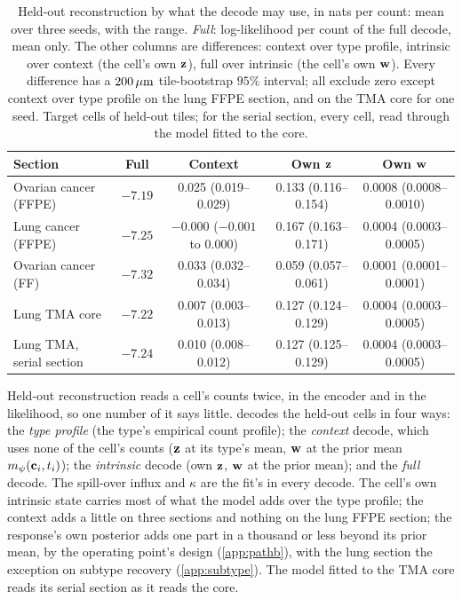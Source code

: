\begin{table}[!htbp]
\centering
\caption{Held-out reconstruction by what the decode may use, in nats per count: mean over three seeds, with the range. \emph{Full}: log-likelihood per count of the full decode, mean only. The other columns are differences: context over type profile, intrinsic over context (the cell's own $\mathbf{z}$), full over intrinsic (the cell's own $\mathbf{w}$). Every difference has a $200\,\mu\text{m}$ tile-bootstrap $95\%$ interval; all exclude zero except context over type profile on the lung FFPE section, and on the TMA core for one seed. Target cells of held-out tiles; for the serial section, every cell, read through the model fitted to the core.}
\label{tab:recon-modes}
\small
\setlength{\tabcolsep}{4pt}
\begin{tabular}{@{}lcccc@{}}
\toprule
Section & Full & Context & Own $\mathbf{z}$ & Own $\mathbf{w}$ \\
\midrule
Ovarian cancer (FFPE) & $-7.19$ & 0.025 (0.019--0.029) & 0.133 (0.116--0.154) & 0.0008 (0.0008--0.0010) \\
Lung cancer (FFPE) & $-7.25$ & $-0.000$ ($-0.001$ to $0.000$) & 0.167 (0.163--0.171) & 0.0004 (0.0003--0.0005) \\
Ovarian cancer (FF) & $-7.32$ & 0.033 (0.032--0.034) & 0.059 (0.057--0.061) & 0.0001 (0.0001--0.0001) \\
Lung TMA core & $-7.22$ & 0.007 (0.003--0.013) & 0.127 (0.124--0.129) & 0.0004 (0.0003--0.0005) \\
Lung TMA, serial section & $-7.24$ & 0.010 (0.008--0.012) & 0.127 (0.125--0.129) & 0.0004 (0.0003--0.0005) \\
\bottomrule
\end{tabular}
\end{table}

Held-out reconstruction reads a cell's counts twice, in the encoder and in the likelihood, so one number of it says little.  decodes the held-out cells in four ways: the \emph{type profile} (the type's empirical count profile); the \emph{context} decode, which uses none of the cell's counts ($\mathbf{z}$ at its type's mean, $\mathbf{w}$ at the prior mean $m_{\psi}(\mathbf{c}_i, t_i)$); the \emph{intrinsic} decode (own $\mathbf{z}$, $\mathbf{w}$ at the prior mean); and the \emph{full} decode. The spill-over influx and $\kappa$ are the fit's in every decode. The cell's own intrinsic state carries most of what the model adds over the type profile; the context adds a little on three sections and nothing on the lung FFPE section; the response's own posterior adds one part in a thousand or less beyond its prior mean, by the operating point's design (\cref{app:pathb}), with the lung section the exception on subtype recovery (\cref{app:subtype}). The model fitted to the TMA core reads its serial section as it reads the core.


